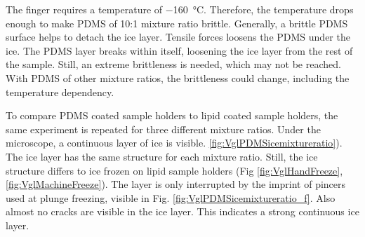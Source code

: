 The finger requires a temperature of \SI{-160}{\degreeCelsius}. Therefore, the temperature drops enough to make PDMS of 10:1 mixture ratio brittle. Generally, a brittle PDMS surface helps to detach the ice layer. Tensile forces loosens the PDMS under the ice. The PDMS layer breaks within itself, loosening the ice layer from the rest of the sample. Still, an extreme brittleness is needed, which may not be reached. With PDMS of other mixture ratios, the brittleness could change, including the temperature dependency.

To compare PDMS coated sample holders to lipid coated sample holders, the same experiment is repeated for three different mixture ratios. Under the microscope, a continuous layer of ice is visible. \ref{fig:VglPDMSicemixtureratio}). The ice layer has the same structure for each mixture ratio. Still, the ice structure differs to ice frozen on lipid sample holders (Fig \ref{fig:VglHandFreeze}, \ref{fig:VglMachineFreeze}). The layer is only interrupted by the imprint of pincers used at plunge freezing, visible in Fig. \ref{fig:VglPDMSicemixtureratio_f}. Also almost no cracks are visible in the ice layer. This indicates a strong continuous ice layer.

